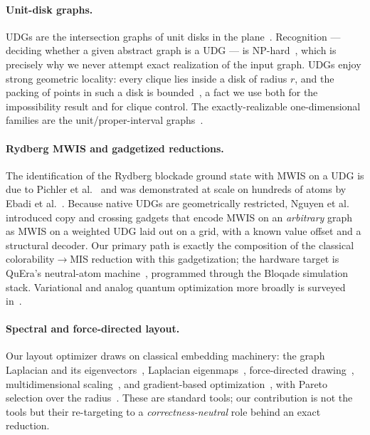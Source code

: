 \documentclass[11pt]{article}
\theoremstyle{definition}
\theoremstyle{remark}
\begin{document}
\paragraph{Unit-disk graphs.} UDGs are the intersection graphs of unit disks in the
plane~\cite{Clark1990UDG}. Recognition --- deciding whether a given abstract graph is
a UDG --- is NP-hard~\cite{Breu1998,Jungck2021}, which is precisely why we never
attempt exact realization of the input graph. UDGs enjoy strong geometric locality:
every clique lies inside a disk of radius $r$, and the packing of points in such a
disk is bounded~\cite{Heppes2003}, a fact we use both for the impossibility result and
for clique control. The exactly-realizable one-dimensional families are the
unit/proper-interval graphs~\cite{Roberts1969,Golumbic1980}.

\paragraph{Rydberg MWIS and gadgetized reductions.} The identification of the Rydberg
blockade ground state with MWIS on a UDG is due to Pichler et al.~\cite{Pichler2018}
and was demonstrated at scale on hundreds of atoms by Ebadi et al.~\cite{Ebadi2022}.
Because native UDGs are geometrically restricted, Nguyen et al.~\cite{Nguyen2023}
introduced copy and crossing gadgets that encode MWIS on an \emph{arbitrary} graph as
MWIS on a weighted UDG laid out on a grid, with a known value offset and a structural
decoder. Our primary path is exactly the composition of the classical
colorability$\to$MIS reduction with this gadgetization; the hardware target is QuEra's
neutral-atom machine~\cite{Wurtz2023,Graham2022}, programmed through the Bloqade
simulation stack. Variational and analog quantum optimization more broadly is surveyed
in~\cite{Cerezo2021,Preskill2018}.

\paragraph{Spectral and force-directed layout.} Our layout optimizer draws on
classical embedding machinery: the graph Laplacian and its
eigenvectors~\cite{Chung1997,Fiedler1973}, Laplacian eigenmaps~\cite{Belkin2003},
force-directed drawing~\cite{Fruchterman1991}, multidimensional
scaling~\cite{Kruskal1964}, and gradient-based
optimization~\cite{Nesterov2004,Boyd2004}, with Pareto selection over the
radius~\cite{Miettinen2014}. These are standard tools; our contribution is not the
tools but their re-targeting to a \emph{correctness-neutral} role behind an exact
reduction.
\end{document}
